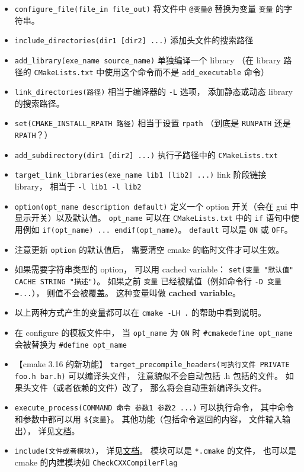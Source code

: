 \begin{itemize}
\item \verb`configure_file(file_in file_out)` 将文件中 \verb`@变量@` 替换为变量 \verb`变量` 的字符串。
\item \verb`include_directories(dir1 [dir2] ...)` 添加头文件的搜索路径
\item \verb`add_library(exe_name source_name)` 单独编译一个 library （在 library 路径的 \verb|CMakeLists.txt| 中使用这个命令而不是 \verb`add_executable` 命令）
\item \verb|link_directories(路径)| 相当于编译器的 \verb`-L` 选项， 添加静态或动态 library 的搜索路径。
\item \verb|set(CMAKE_INSTALL_RPATH 路径)| 相当于设置 \verb|rpath| （到底是 \verb|RUNPATH| 还是 \verb|RPATH|？）
\item \verb`add_subdirectory(dir1 [dir2] ...)` 执行子路径中的 \verb|CMakeLists.txt|
\item \verb`target_link_libraries(exe_name lib1 [lib2] ...)` link 阶段链接 library， 相当于 \verb|-l lib1 -l lib2|
\item \verb`option(opt_name description default)` 定义一个 option 开关（会在 gui 中显示开关）以及默认值。 \verb`opt_name` 可以在 \verb|CMakeLists.txt| 中的 \verb`if` 语句中使用例如 \verb`if(opt_name) ... endif(opt_name)`。 \verb`default` 可以是 \verb`ON` 或 \verb`OFF`。
\item 注意更新 \verb|option| 的默认值后， 需要清空 cmake 的临时文件才可以生效。
\item 如果需要字符串类型的 option， 可以用 cached variable： \verb|set(变量 "默认值" CACHE STRING "描述")|。 如果之前 \verb|变量| 已经被赋值（例如命令行 \verb|-D 变量=...|）， 则值不会被覆盖。 这种变量叫做 \textbf{cached variable}。
\item 以上两种方式产生的变量都可以在 \verb|cmake -LH .| 的帮助中看到说明。
\item 在 configure 的模板文件中， 当 \verb`opt_name` 为 \verb`ON` 时 \verb`#cmakedefine opt_name` 会被替换为 \verb`#define opt_name`
\item 【cmake 3.16 的新功能】 \verb|target_precompile_headers(可执行文件 PRIVATE foo.h bar.h)| 可以编译头文件， 注意貌似不会自动包括 .h 包括的文件。 如果头文件（或者依赖的文件）改了， 那么将会自动重新编译头文件。
\item \verb|execute_process(COMMAND 命令 参数1 参数2 ...)| 可以执行命令， 其中命令和参数中都可以用 \verb|${变量}|。 其他功能（包括命令返回的内容， 文件输入输出）， 详见\href{https://cmake.org/cmake/help/latest/command/execute_process.html}{文档}。
\item \verb|include(文件或者模块)|， 详见\href{https://cmake.org/cmake/help/latest/command/include.html}{文档}。 模块可以是 \verb|*.cmake| 的文件， 也可以是 cmake 的内建模块如 \verb|CheckCXXCompilerFlag|

\end{itemize}
